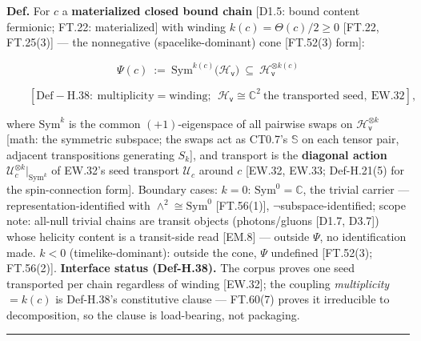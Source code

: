 \begin{definition}\label{tag:Def-H-23}
\textbf{Def.} For $c$ a \textbf{materialized closed bound chain} [D1.5: bound content fermionic; FT.22: materialized] with winding $k(c)=\Theta(c)/2\ge0$ [FT.22, FT.25(3)] — the nonnegative (spacelike-dominant) cone [FT.52(3) form]:

\[
\Psi(c)\ :=\ \mathrm{Sym}^{k(c)}\bigl(\mathcal H_{\mathsf v}\bigr)\ \subseteq\ \mathcal H_{\mathsf v}^{\otimes k(c)}
\]

\[
\qquad [\mathrm{Def-H.38}:\ \text{multiplicity}=\text{winding};\ \ \mathcal H_{\mathsf v}\cong\mathbb C^2\ \text{the transported seed},\ \mathrm{EW.32}],
\]

where $\mathrm{Sym}^{k}$ is the common $(+1)$-eigenspace of all pairwise swaps on $\mathcal H_{\mathsf v}^{\otimes k}$ [math: the symmetric subspace; the swaps act as CT0.7's $\mathbb S$ on each tensor pair, adjacent transpositions generating $S_k$], and transport is the \textbf{diagonal action} $\mathcal U_c^{\otimes k}\big|_{\mathrm{Sym}^k}$ of EW.32's seed transport $\mathcal U_c$ around $c$ [EW.32, EW.33; Def-H.21(5) for the spin-connection form]. Boundary cases: $k=0$: $\mathrm{Sym}^0=\mathbb C$, the trivial carrier — representation-identified with $\wedge^2\cong\mathrm{Sym}^0$ [FT.56(1)], $\neg$subspace-identified; scope note: all-null trivial chains are transit objects (photons/gluons [D1.7, D3.7]) whose helicity content is a transit-side read [EM.8] — outside $\Psi$, no identification made. $k<0$ (timelike-dominant): outside the cone, $\Psi$ undefined [FT.52(3); FT.56(2)]. \textbf{Interface status (Def-H.38).} The corpus proves one seed transported per chain regardless of winding [EW.32]; the coupling \textit{multiplicity $=k(c)$} is Def-H.38's constitutive clause — FT.60(7) proves it irreducible to decomposition, so the clause is load-bearing, not packaging.

\vspace{2pt}\noindent\rule{\textwidth}{0.4pt}\vspace{2pt}

\end{definition}

